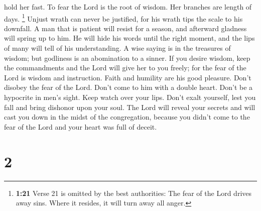 hold her fast.  To fear the Lord is the root of wisdom.
Her branches are length of days.  \footnote{\textbf{1:21}
  Verse 21 is omitted by the best authorities: The fear of the Lord
  drives away sins. Where it resides, it will turn away all anger.}
 Unjust wrath can never be justified, for his wrath tips
the scale to his downfall.  A man that is patient will
resist for a season, and afterward gladness will spring up to him.
 He will hide his words until the right moment, and the
lips of many will tell of his understanding.  A wise
saying is in the treasures of wisdom; but godliness is an abomination to
a sinner.  If you desire wisdom, keep the commandments
and the Lord will give her to you freely;  for the fear
of the Lord is wisdom and instruction. Faith and humility are his good
pleasure.  Don't disobey the fear of the Lord. Don't come
to him with a double heart.  Don't be a hypocrite in
men's sight. Keep watch over your lips.  Don't exalt
yourself, lest you fall and bring dishonor upon your soul. The Lord will
reveal your secrets and will cast you down in the midst of the
congregation, because you didn't come to the fear of the Lord and your
heart was full of deceit.

\hypertarget{section-1}{%
\section{2}\label{section-1}}

